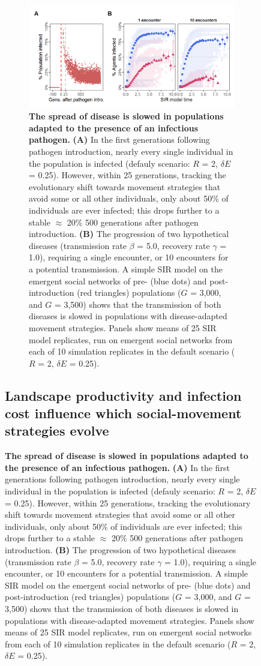 \begin{figure}[!h]
\begin{figure}[!h]
    \centering
    \includegraphics[width=0.9\linewidth]{figures/pathomove/fig_04.png}
    \caption{
        \textbf{The spread of disease is slowed in populations adapted to the presence of an infectious pathogen.}
        \textbf{(A)} In the first generations following pathogen introduction, nearly every single individual in the population is infected (defauly scenario: $R$ = 2, $\delta E$ = 0.25).
        However, within 25 generations, tracking the evolutionary shift towards movement strategies that avoid some or all other individuals, only about 50\% of individuals are ever infected; this drops further to a stable $\approx$ 20\% 500 generations after pathogen introduction.
        \textbf{(B)} The progression of two hypothetical diseases (transmission rate $\beta$ = 5.0, recovery rate $\gamma$ = 1.0), requiring  a single encounter, or 10 encounters for a potential transmission.
        A simple SIR model on the emergent social networks of pre- (blue dots) and post-introduction (red triangles) populations ($G$ = 3,000, and $G$ = 3,500) shows that the transmission of both diseases is slowed in populations with disease-adapted movement strategies.
        Panels show means of 25 SIR model replicates, run on emergent social networks from each of 10 simulation replicates in the default scenario ($R$ = 2, $\delta E$ = 0.25).
    }\label{patho_fig_04}
\end{figure}

\subsection*{Landscape productivity and infection cost influence which social-movement strategies evolve}


\end{figure}
